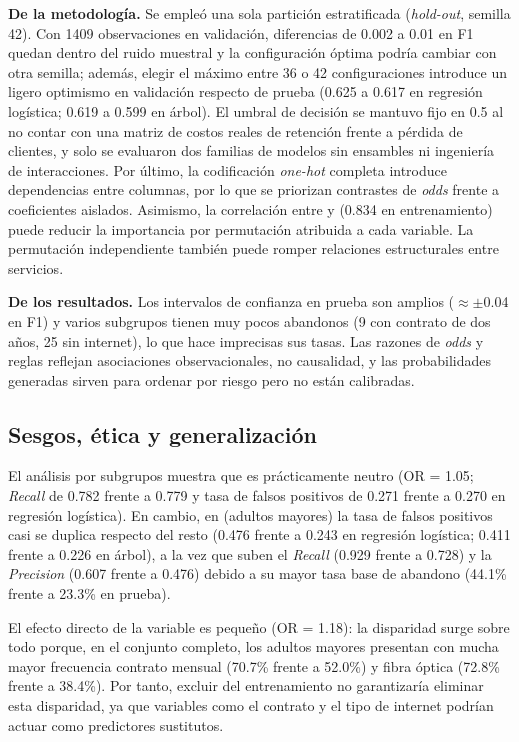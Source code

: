 \textbf{De la metodología.} Se empleó una sola partición estratificada (\emph{hold-out}, semilla 42).
Con 1409 observaciones en validación, diferencias de 0.002 a 0.01 en F1 quedan dentro del ruido
muestral y la configuración óptima podría cambiar con otra semilla; además, elegir el máximo entre 36
o 42 configuraciones introduce un ligero optimismo en validación respecto de prueba (0.625 a 0.617 en
regresión logística; 0.619 a 0.599 en árbol). El umbral de decisión se mantuvo fijo en 0.5 al no
contar con una matriz de costos reales de retención frente a pérdida de clientes, y solo se evaluaron
dos familias de modelos sin ensambles ni ingeniería de interacciones. 
Por último, la codificación \emph{one-hot} completa introduce dependencias entre columnas, por lo que
se priorizan contrastes de \emph{odds} frente a coeficientes aislados. Asimismo, la correlación
entre  y  (0.834 en entrenamiento) puede reducir la importancia por
permutación atribuida a cada variable. La permutación independiente también puede romper
relaciones estructurales entre servicios.

\textbf{De los resultados.} Los intervalos de confianza en prueba son amplios ($\approx\pm$0.04 en F1)
y varios subgrupos tienen muy pocos abandonos (9 con contrato de dos años, 25 sin internet), lo que
hace imprecisas sus tasas. Las razones de \emph{odds} y reglas reflejan asociaciones observacionales,
no causalidad, y las probabilidades generadas sirven para ordenar por riesgo pero no están calibradas.

\subsection{Sesgos, ética y generalización}
El análisis por subgrupos muestra que  es prácticamente neutro (OR = 1.05; \emph{Recall}
de 0.782 frente a 0.779 y tasa de falsos positivos de 0.271 frente a 0.270 en regresión logística).
En cambio, en  (adultos mayores) la tasa de falsos positivos casi se duplica
respecto del resto (0.476 frente a 0.243 en regresión logística; 0.411 frente a 0.226 en árbol), a la
vez que suben el \emph{Recall} (0.929 frente a 0.728) y la \emph{Precision} (0.607 frente a 0.476)
debido a su mayor tasa base de abandono (44.1\% frente a 23.3\% en prueba).

El efecto directo de la variable es pequeño (OR = 1.18): la disparidad surge sobre todo porque, en el
conjunto completo, los adultos mayores presentan con mucha mayor frecuencia contrato mensual (70.7\%
frente a 52.0\%) y fibra óptica (72.8\% frente a 38.4\%). Por tanto, excluir  del
entrenamiento no garantizaría eliminar esta disparidad, ya que variables como el contrato y
el tipo de internet podrían actuar como predictores sustitutos.

